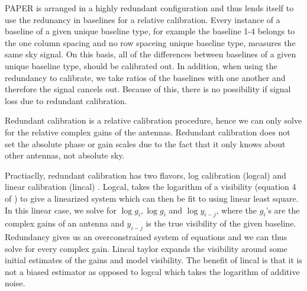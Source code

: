 \documentclass[twocolumn,numberedappendix]{emulateapj}
\begin{document}
%    
%       

PAPER is arranged in a highly redundant configuration and thus lends itself to
use the redunancy in baselines for a relative calibration. Every instance of a
baseline of a given unique baseline type, for example the baseline 1-4 belongs
to the one column spacing and no row spaceing unique baseline type, measures the
same sky signal. On this basis, all of the differences between baselines of a
given unique baseline type, should be calibrated out. In addition, when using
the redundancy to calibrate, we take ratios of the baselines with one another
and therefore the signal cancels out. Because of this, there is no possibility
if signal loss due to redundant calibration.

Redundant calibration is a relative calibration procedure, hence we can only
solve for the relative complex gains of the antennas. Redundant calibration does
not set the absolute phase or gain scales due to the fact that it only knows
about other antennas, not absolute sky.  

Practiaclly, redundant calibration has two flavors, log calibration (logcal) and linear
calibration (lincal) \cite{liu_et_al2010,zheng_et_al2014}. Logcal, takes the
logarithm of a visibility (equation 4 of \cite{zheng_et_al2014}) to give a
linearized system which can then be fit to using linear least square. In this
linear case, we solve for $\log{g_{i}},\log{g_{i}}$ and $\log{y_{i-j}}$, where
the $g_{i}$'s are the complex gains of an antenna and $y_{i-j}$ is the true
visibility of the given baseline. Redundancy gives us an overconstrained system
of equations and we can thus solve for every complex gain. Lincal taylor expands
the visibility around some initial estimates of the gains and model visibility.
The benefit of lincal is that it is not a biased estimator as opposed to logcal
which takes the logarithm of additive noise.
\end{document}
